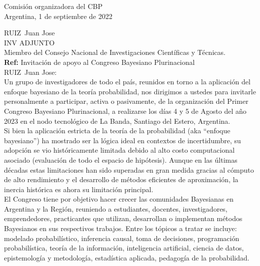 \documentclass[a4paper,11pt]{article}
\begin{document}
\begin{flushright}
Comisión organizadora del CBP \\
Argentina, 1 de septiembre de 2022
\end{flushright} 

\vspace{0.1cm}
\noindent
RUIZ Juan Jose\\
INV ADJUNTO \\
Miembro del Consejo Nacional de Investigaciones Científicas y Técnicas.\\[-0.1cm]

\hfill \textbf{Ref:} Invitación de apoyo al Congreso Bayesiano Plurinacional \\

\vspace{0.3cm} \noindent RUIZ Juan Jose:\\

\indent Un grupo de investigadores de todo el país, reunidos en torno a la aplicación del enfoque bayesiano de la teoría probabilidad, nos dirigimos a ustedes para invitarle personalmente a participar, activa o pasivamente, de la organización del Primer Congreso Bayesiano Plurinacional, a realizarse los días 4 y 5 de Agosto del año 2023 en el nodo tecnológico de La Banda, Santiago del Estero, Argentina. \\

\indent Si bien la aplicación estricta de la teoría de la probabilidad (aka ``enfoque bayesiano'') ha mostrado ser la lógica ideal en contextos de incertidumbre, su adopción se vio históricamente limitada debido al alto costo computacional asociado (evaluación de todo el espacio de hipótesis). Aunque en las últimas décadas estas limitaciones han sido superadas en gran medida gracias al cómputo de alto rendimiento y el desarrollo de métodos eficientes de aproximación, la inercia histórica es ahora su limitación principal. \\

\indent  El Congreso tiene por objetivo hacer crecer las comunidades Bayesianas en Argentina y la Región, reuniendo a estudiantes, docentes, investigadores, emprendedores, practicantes que utilizan, desarrollan o implementan métodos Bayesianos en sus respectivos trabajos. Entre los tópicos a tratar se incluye: modelado probabilístico, inferencia causal, toma de decisiones, programación probabilística, teoría de la información, inteligencia artificial, ciencia de datos, epistemología y metodología, estadística aplicada, pedagogía de la probabilidad. \\
\end{document}
